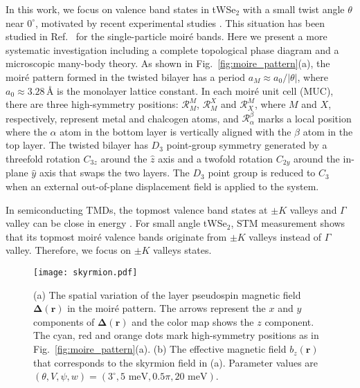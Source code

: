 \documentclass[aps,prx,floatfix,twocolumn]{revtex4-1}
\begin{document}
	In this work, we focus on valence band states in tWSe$_2$ with a small twist angle $\theta$ near $0^{\circ}$, motivated by recent experimental studies \cite{wang2019magic,zhang2020flat}. This situation has been studied in Ref.~ for the single-particle moir\'e bands. Here we present a more systematic investigation including a complete topological phase diagram and a microscopic many-body theory. As shown in Fig.~\ref{fig:moire_pattern}(a), the  moir\'e pattern formed in the twisted bilayer has a period $a_M \approx a_0/|\theta|$, where $a_0 \approx 3.28 \, \text{\AA}$  is the monolayer lattice constant. In each moir\'e unit cell (MUC), there are three high-symmetry positions: $\mathcal{R}_{M}^M$, $\mathcal{R}_{M}^X$ and $\mathcal{R}_{X}^M$, where  $M$ and $X$, respectively, represent metal and chalcogen atoms, and $\mathcal{R}_{\alpha}^{\beta}$ marks a local position where the $\alpha$ atom in the bottom layer is vertically aligned with the $\beta$ atom in the top layer. The twisted bilayer has $D_3$ point-group symmetry generated by a threefold rotation $C_{3z}$ around the  $\hat{z}$ axis and
	a twofold rotation $C_{2y}$ around the in-plane $\hat{y}$ axis that swaps the two layers. The $D_3$ point group is reduced to $C_3$ when an external out-of-plane displacement field is applied to the system.
	
	In semiconducting TMDs, the topmost valence band states at $\pm K$ valleys and $\Gamma$ valley can be close in energy \cite{liu2013threeband}. For small angle tWSe$_2$, STM measurement shows that its topmost moir\'e valence bands originate from $\pm K$ valleys instead of  $\Gamma$ valley\cite{zhang2020flat}. Therefore, we focus on $\pm K$ valleys states.  
	

	
	\begin{figure}[t]
		\centering
		\texttt{[image: skyrmion.pdf]}
		\caption{(a) The spatial variation of the layer pseudospin magnetic field $\bm{\Delta}(\bm{r})$ in the moir\'e pattern. The arrows represent the $x$ and $y$ components of $ \bm{\Delta}(\bm{r}) $ and the color map shows the $ z $  component. The cyan, red and orange dots mark high-symmetry positions as in Fig.~\ref{fig:moire_pattern}(a). (b) The effective magnetic field $ b_z(\bm{r}) $ that corresponds to the skyrmion field in (a).  Parameter values are $\left(\theta,V,\psi,w\right)=(3^\circ,5\text{ meV}, 0.5\pi, 20\text{ meV})$.}	
		\label{fig:skyrmion}
	\end{figure}
	
\end{document}
